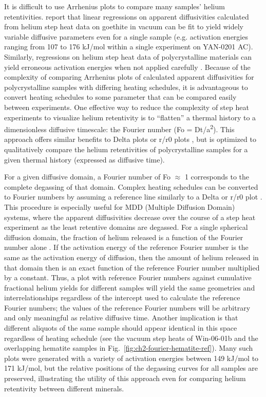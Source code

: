 It is difficult to use Arrhenius plots to compare many samples' helium
retentivities. \citet{farley2024} report that linear regressions on
apparent diffusivities calculated from helium step heat data on goethite
in vacuum can be fit to yield widely variable diffusive parameters even
for a single sample (e.g. activation energies ranging from 107 to 176
kJ/mol within a single experiment on YAN-0201 AC). Similarly,
regressions on helium step heat data of polycrystalline materials can
yield erroneous activation energies when not applied carefully \citep{farley2018}. Because of the complexity of comparing Arrhenius plots of
calculated apparent diffusivities for polycrystalline samples with
differing heating schedules, it is advantageous to convert heating
schedules to some parameter that can be compared easily between
experiments. One effective way to reduce the complexity of step heat
experiments to visualize helium retentivity is to ``flatten'' a thermal
history to a dimensionless diffusive timescale: the Fourier number (Fo =
Dt/a\textsuperscript{2}). This approach offers similar benefits to Delta plots
\citep{farley2018} or r/r0 plots \citep{lovera1991}, but is optimized to
qualitatively compare the helium retentivities of polycrystalline
samples for a given thermal history (expressed as diffusive time).

For a given diffusive domain, a Fourier number of Fo $\approx$ 1 corresponds to
the complete degassing of that domain. Complex heating schedules can be
converted to Fourier numbers by assuming a reference line similarly to a
Delta or r/r0 plot \citep{lovera1991,farley2018}. This procedure
is especially useful for MDD (Multiple Diffusion Domain) systems, where
the apparent diffusivities decrease over the course of a step heat
experiment as the least retentive domains are degassed. For a single
spherical diffusion domain, the fraction of helium released is a
function of the Fourier number alone \citep{crank1979,fechtigkalbitzer1966}. If the activation energy of the reference
Fourier number is the same as the activation energy of diffusion, then
the amount of helium released in that domain then is an exact function
of the reference Fourier number multiplied by a constant. Thus, a plot
with reference Fourier numbers against cumulative fractional helium
yields for different samples will yield the same geometries and
interrelationships regardless of the intercept used to calculate the
reference Fourier numbers; the values of the reference Fourier numbers
will be arbitrary and only meaningful as relative diffusive time.
Another implication is that different aliquots of the same sample should
appear identical in this space regardless of heating schedule (see the vacuum step heats of
Win-06-01b and the overlapping hematite samples in Fig.~\ref{fig:ch2-fourier-hematite-ref}).
Many such plots were generated with a variety of activation energies between
149 kJ/mol to 171 kJ/mol, but the relative positions of the degassing curves for all samples are preserved, 
illustrating the utility of this approach even for comparing helium retentivity between different minerals. 

